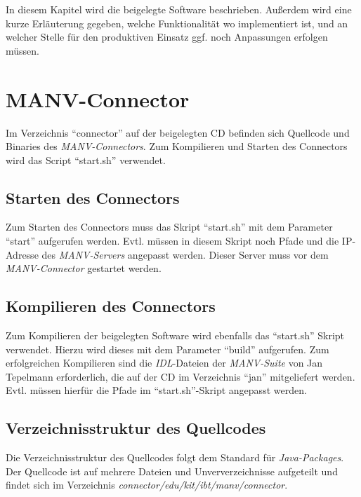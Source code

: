     In diesem Kapitel wird die beigelegte Software beschrieben. Außerdem wird eine
    kurze Erläuterung gegeben, welche Funktionalität wo implementiert ist, und an
    welcher Stelle für den produktiven Einsatz ggf. noch Anpassungen erfolgen müssen.

    \section{MANV-Connector}
    Im Verzeichnis "`connector"' auf der beigelegten CD befinden sich
    Quellcode und Binaries des \emph{MANV-Connectors}. Zum Kompilieren
    und Starten des Connectors wird das Script "`start.sh"' verwendet.

    \subsection{Starten des Connectors}

    Zum Starten des Connectors muss das Skript "`start.sh"' mit dem Parameter
    "`start"' aufgerufen werden. Evtl. müssen in diesem Skript noch Pfade
    und die IP-Adresse des \emph{MANV-Servers} angepasst werden. 
    Dieser Server muss vor dem \emph{MANV-Connector} gestartet werden.

    \subsection{Kompilieren des Connectors}

    Zum Kompilieren der beigelegten Software wird ebenfalls das "`start.sh"'
    Skript verwendet. Hierzu wird dieses mit dem Parameter "`build"' aufgerufen.
    Zum erfolgreichen Kompilieren sind die \emph{IDL}-Dateien der \emph{MANV-Suite}
    von Jan Tepelmann erforderlich, die auf der CD im Verzeichnis "`jan"'
    mitgeliefert werden. Evtl. müssen hierfür die Pfade im "`start.sh"'-Skript 
    angepasst werden.

    \subsection{Verzeichnisstruktur des Quellcodes}

    Die Verzeichnisstruktur des Quellcodes folgt dem Standard für \emph{Java-Packages}.
    Der Quellcode ist auf mehrere Dateien und Unververzeichnisse aufgeteilt
    und findet sich im Verzeichnis \emph{connector/edu/kit/ibt/manv/connector}.
    
